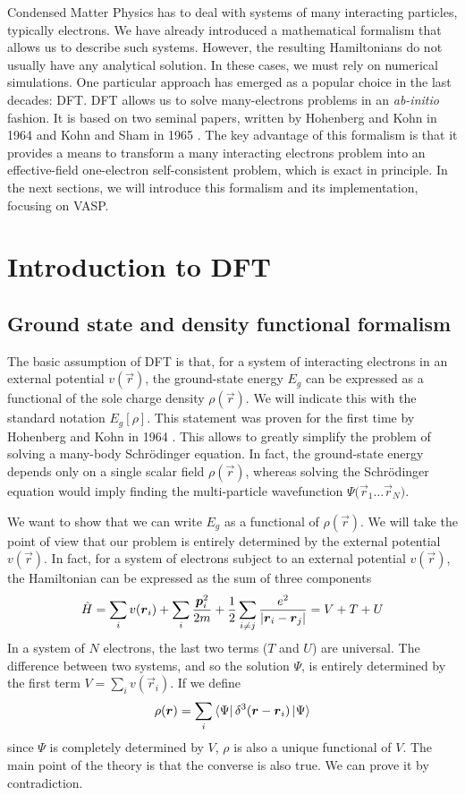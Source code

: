 Condensed Matter Physics has to deal with systems of many interacting particles, typically electrons. We have already introduced a mathematical formalism that allows us to describe such systems. However, the resulting Hamiltonians do not usually have any analytical solution. In these cases, we must rely on numerical simulations. One particular approach has emerged as a popular choice in the last decades: DFT. DFT allows us to solve many-electrons problems in an \emph{ab-initio} fashion. It is based on two seminal papers, written by Hohenberg and Kohn in 1964 \cite{hohenberg1964} and Kohn and Sham in 1965 \cite{kohn1965}. The key advantage of this formalism is that it provides a means to transform a many interacting electrons problem into an effective-field one-electron self-consistent problem, which is exact in principle. In the next sections, we will introduce this formalism and its implementation, focusing on VASP.

\section{Introduction to DFT}
\subsection{Ground state and density functional formalism}
The basic assumption of DFT is that, for a system of interacting electrons in an external potential $v(\vec{r})$, the ground-state energy $E_g$ can be expressed as a functional of the sole charge density $\rho(\vec{r})$. We will indicate this with the standard notation $E_g[\rho]$. This statement was proven for the first time by Hohenberg and Kohn in 1964 \cite{hohenberg1964}. This allows to greatly simplify the problem of solving a many-body Schrödinger equation. In fact, the ground-state energy depends only on a single scalar field $\rho(\vec{r})$, whereas solving the Schrödinger equation would imply finding the multi-particle wavefunction $\Psi{(\vec{r}_1\dots \vec{r}_N})$.

We want to show that we can write $E_g$ as a functional of $\rho(\vec{r})$. We will take the point of view that our problem is entirely determined by the external potential $v(\vec{r})$. In fact, for a system of electrons subject to an external potential $v(\vec{r})$, the Hamiltonian can be expressed as the sum of three components
\begin{equation} \label{eq:hamiltonian_DFT}
    \hat{H} = \sum_i v(\mathbf{\boldsymbol{r}}_i) + \sum_i \frac{\mathbf{\boldsymbol{p}}_i^2}{2m} + \frac{1}{2} \sum_{i\neq j} \frac{e^2}{|\mathbf{\boldsymbol{r}}_i - \mathbf{\boldsymbol{r}}_j|} = V + T + U
\end{equation}
In a system of $N$ electrons, the last two terms ($T$ and $U$) are universal. The difference between two systems, and so
the solution $\Psi$, is entirely determined by the first term $V = \sum_i v(\vec{r}_i)$. If we define
\begin{equation}
    \rho(\mathbf{\boldsymbol{r}}) = \sum_i \bra{\Psi} \delta^3(\mathbf{\boldsymbol{r}}-\mathbf{\boldsymbol{r}}_i)\ket{\Psi}
\end{equation}
since $\Psi$ is completely determined by $V$, $\rho$ is also a unique functional of $V$. The main point of the theory is that  the converse is also true. We can prove it by contradiction.

